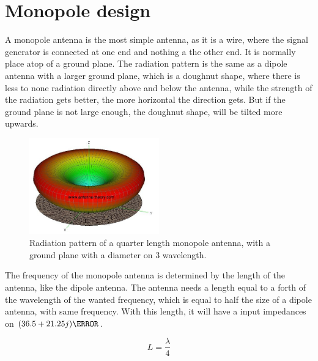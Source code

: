 \chapter{Monopole design}

A monopole antenna is the most simple antenna, as it is a wire, where the signal generator is connected at one end and nothing a the other end. It is normally place atop of a ground plane. The radiation pattern is the same as a dipole antenna with a larger ground plane, which is a doughnut shape, where there is less to none radiation directly above and below the antenna, while the strength of the radiation gets better, the more horizontal the direction gets. But if the ground plane is not large enough, the doughnut shape, will be tilted more upwards.

\begin{figure}[H]
\centering
\includegraphics[width=0.5\textwidth]{figure/disturbedMonopole.jpg}
\caption{Radiation pattern of a quarter length monopole antenna, with a ground plane with a diameter on 3 wavelength.}
\label{fig:disMono}
\end{figure}

The frequency of the monopole antenna is determined by the length of the antenna, like the dipole antenna. The antenna needs a length equal to a forth of the wavelength of the wanted frequency, which is equal to half the size of a dipole antenna, with same frequency. With this length, it will have a input impedances on $(36.5 + 21.25j) \ohm$.

\begin{equation}\label{eq:lengthMono}
L = \frac{\lambda}{4}
\end{equation}
\begin{where}
\end{where}

